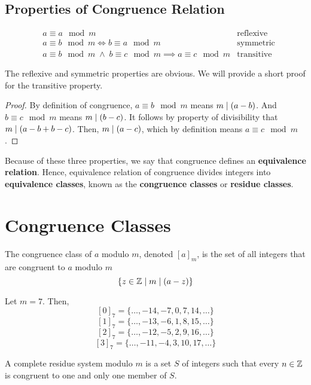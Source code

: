 \subsection{Properties of Congruence Relation}

$$
\begin{aligned}
    &a \equiv a \mod m & \text{reflexive} \\
    &a \equiv b \mod m \iff b \equiv a \mod m & \text{symmetric} \\
    &a \equiv b \mod m \;\land\; b \equiv c \mod m \implies a \equiv c \mod m & \text{transitive}
\end{aligned}
$$

The reflexive and symmetric properties are obvious. We will provide a short proof for the transitive property.

\begin{proof}
    By definition of congruence, $a \equiv b \mod m$ means $m \mathrel{\mid} (a-b)$. And $b \equiv c \mod m$ means $m \mathrel{\mid} (b-c)$. It follows by property of divisibility that $m \mathrel{\mid} (a-b+b-c)$. Then, $m \mathrel{\mid} (a-c)$, which by definition means $a \equiv c \mod m$.
\end{proof}

Because of these three properties, we say that congruence defines an \textbf{equivalence relation}. Hence, equivalence relation of congruence divides integers into \textbf{equivalence classes}, known as the \textbf{congruence classes} or \textbf{residue classes}.

\section{Congruence Classes}

\begin{definition}
    The congruence class of $a$ modulo $m$, denoted $[a]_m$, is the set of all integers that are congruent to $a$ modulo $m$
    $$
    \{ z \in \mathbb{Z} \mid m \mathrel{\mid} (a-z) \}
    $$
\end{definition}

\begin{example}
    Let $m = 7$. Then,
    $$
    [0]_7 = \{\ldots,-14,-7,0,7,14,\ldots\}
    $$
    $$
    [1]_7 = \{\ldots,-13,-6,1,8,15,\ldots\}
    $$
    $$
    [2]_7 = \{\ldots,-12,-5,2,9,16,\ldots\}
    $$
    $$
    [3]_7 = \{\ldots,-11,-4,3,10,17,\ldots\}
    $$
\end{example}

\begin{definition}
    A complete residue system modulo $m$ is a set $S$ of integers such that every $n \in \mathbb{Z}$ is congruent to one and only one member of $S$.
\end{definition}


